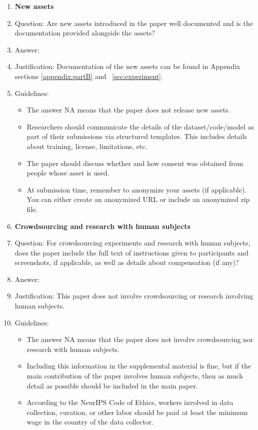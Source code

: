 \documentclass{article}
\begin{document}
\begin{enumerate}
\item {\bf New assets}
    \item[] Question: Are new assets introduced in the paper well documented and is the documentation provided alongside the assets?
    \item[] Answer: \answerYes{} %
    \item[] Justification: Documentation of the new assets can be found in Appendix sections \ref{appendix:partB} and ~\ref{sec:experiment}.
    \item[] Guidelines:
    \begin{itemize}
        \item The answer NA means that the paper does not release new assets.
        \item Researchers should communicate the details of the dataset/code/model as part of their submissions via structured templates. This includes details about training, license, limitations, etc. 
        \item The paper should discuss whether and how consent was obtained from people whose asset is used.
        \item At submission time, remember to anonymize your assets (if applicable). You can either create an anonymized URL or include an anonymized zip file.
    \end{itemize}

\item {\bf Crowdsourcing and research with human subjects}
    \item[] Question: For crowdsourcing experiments and research with human subjects, does the paper include the full text of instructions given to participants and screenshots, if applicable, as well as details about compensation (if any)? 
    \item[] Answer: \answerNA{} %
    \item[] Justification: This paper does not involve crowdsourcing or research involving human subjects.
    \item[] Guidelines:
    \begin{itemize}
        \item The answer NA means that the paper does not involve crowdsourcing nor research with human subjects.
        \item Including this information in the supplemental material is fine, but if the main contribution of the paper involves human subjects, then as much detail as possible should be included in the main paper. 
        \item According to the NeurIPS Code of Ethics, workers involved in data collection, curation, or other labor should be paid at least the minimum wage in the country of the data collector. 
    \end{itemize}


\end{enumerate}
\end{document}
